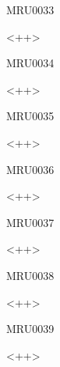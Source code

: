\documentclass{article}
\begin{document}
\begin{corrige}{MRU0033}

<++>

\end{corrige}%


\begin{corrige}{MRU0034}

<++>

\end{corrige}%


\begin{corrige}{MRU0035}

<++>

\end{corrige}%


\begin{corrige}{MRU0036}

<++>

\end{corrige}%


\begin{corrige}{MRU0037}

<++>

\end{corrige}%


\begin{corrige}{MRU0038}

<++>

\end{corrige}%


\begin{corrige}{MRU0039}

<++>

\end{corrige}%
\end{document}
